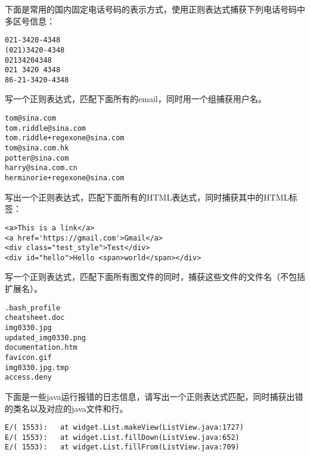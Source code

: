\documentclass[addpoints,12pt,answers]{exam}
\begin{document}
\begin{CJK*}{UTF8}{gbsn}
\begin{questions}
\question[5]
下面是常用的国内固定电话号码的表示方式，使用正则表达式捕获下列电话号码中多区号信息：
\begin{lstlisting}
021-3420-4348
(021)3420-4348
02134204348
021 3420 4348
86-21-3420-4348
\end{lstlisting}
\begin{solution}
\vspace{2in}
\end{solution}

\question[5]
写一个正则表达式，匹配下面所有的email，同时用一个组捕获用户名。
\begin{lstlisting}
tom@sina.com
tom.riddle@sina.com
tom.riddle+regexone@sina.com
tom@sina.com.hk
potter@sina.com
harry@sina.com.cn
herminorie+regexone@sina.com
\end{lstlisting}
\begin{solution}
\vspace{2in}
\end{solution}

\question[5]
写出一个正则表达式，匹配下面所有的HTML表达式，同时捕获其中的HTML标签：
\begin{lstlisting}
<a>This is a link</a>
<a href='https://gmail.com'>Gmail</a>
<div class="test_style">Test</div>
<div id="hello">Hello <span>world</span></div>
\end{lstlisting}
\begin{solution}
\vspace{2in}
\end{solution}

\question[5]
写一个正则表达式，匹配下面所有图文件的同时，捕获这些文件的文件名（不包括扩展名）。
\begin{lstlisting}
.bash_profile
cheatsheet.doc
img0330.jpg
updated_img0330.png
documentation.htm
favicon.gif
img0330.jpg.tmp
access.deny
\end{lstlisting}
\begin{solution}
\vspace{2in}
\end{solution}


\question[5]
下面是一些java运行报错的日志信息，请写出一个正则表达式匹配，同时捕获出错的类名以及对应的java文件和行。
\begin{lstlisting}
E/( 1553):   at widget.List.makeView(ListView.java:1727)
E/( 1553):   at widget.List.fillDown(ListView.java:652)
E/( 1553):   at widget.List.fillFrom(ListView.java:709)
\end{lstlisting}
\begin{solution}
\vspace{2in}
\end{solution}



\end{questions}
\end{CJK*}
\end{document}
